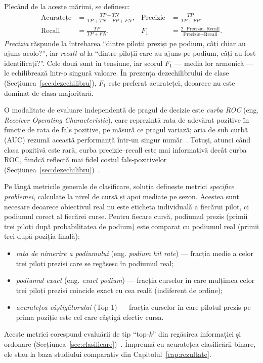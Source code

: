 \documentclass[12pt,a4paper]{report}
\begin{document}
Plecând de la aceste mărimi, se definesc:
\begin{align}
  \text{Acuratețe} &= \frac{TP + TN}{TP + TN + FP + FN}, &
  \text{Precizie} &= \frac{TP}{TP + FP}, \label{eq:acc}\\
  \text{Recall} &= \frac{TP}{TP + FN}, &
  F_1 &= \frac{2 \cdot \text{Precizie} \cdot \text{Recall}}{\text{Precizie} + \text{Recall}}.
  \label{eq:f1}
\end{align}
\emph{Precizia} răspunde la întrebarea ``dintre piloții preziși pe podium, câți chiar au ajuns
acolo?'', iar \emph{recall-ul} la ``dintre piloții care au ajuns pe podium, câți au fost
identificați?''. Cele două sunt în tensiune, iar scorul $F_1$ --- media lor armonică --- le
echilibrează într-o singură valoare. În prezența dezechilibrului de clase
(Secțiunea~\ref{sec:dezechilibru}), $F_1$ este preferat acurateței, deoarece nu este dominat de
clasa majoritară.

O modalitate de evaluare independentă de pragul de decizie este \emph{curba ROC} (eng.
\emph{Receiver Operating Characteristic}), care reprezintă rata de adevărat pozitive în funcție
de rata de fals pozitive, pe măsură ce pragul variază; aria de sub curbă (AUC) rezumă această
performanță într-un singur număr~\cite{fawcett2006roc}. Totuși, atunci când clasa pozitivă este
rară, curba precizie--recall este mai informativă decât curba ROC, fiindcă reflectă mai fidel
costul fals-pozitivelor (Secțiunea~\ref{sec:dezechilibru})~\cite{saito2015precision}.

Pe lângă metricile generale de clasificare, soluția definește metrici \emph{specifice problemei},
calculate la nivel de cursă și apoi mediate pe sezon. Acestea sunt necesare deoarece obiectivul
real nu este eticheta individuală a fiecărui pilot, ci podiumul corect al fiecărei curse. Pentru
fiecare cursă, podiumul prezis (primii trei piloți după probabilitatea de podium) este comparat
cu podiumul real (primii trei după poziția finală):
\begin{itemize}
  \item \emph{rata de nimerire a podiumului} (eng. \emph{podium hit rate}) --- fracția medie a
    celor trei piloți preziși care se regăsesc în podiumul real;
  \item \emph{podiumul exact} (eng. \emph{exact podium}) --- fracția curselor în care mulțimea
    celor trei piloți preziși coincide exact cu cea reală (indiferent de ordine);
  \item \emph{acuratețea câștigătorului} (Top-1) --- fracția curselor în care pilotul prezis pe
    prima poziție este cel care câștigă efectiv cursa.
\end{itemize}
Aceste metrici corespund evaluării de tip ``top-$k$'' din regăsirea informației și ordonare
(Secțiunea~\ref{sec:clasificare})~\cite{liu2009learning}. Împreună cu acuratețea clasificării
binare, ele stau la baza studiului comparativ din Capitolul~\ref{cap:rezultate}.
\end{document}
